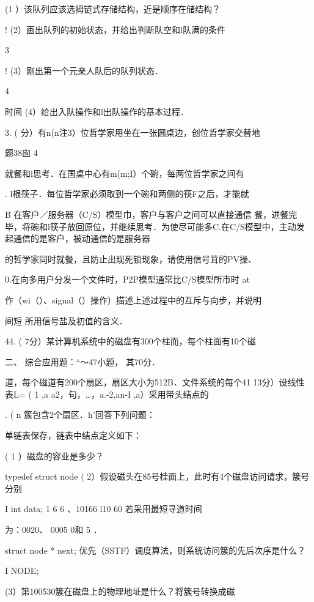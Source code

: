 {{    (1  ）该队列应该选拇链式存储结构，近是顺序在储结构？

    !    (2）画出队列的初始状态，并给出判断队空和l队满的条件

    3

    !    (3）刚出第一个元亲人队后的队列状态．

    4

    时间    (4）给出入队操作和l出队操作的基本过程．

    3. ( 分）有n(n注3）位哲学家用坐在一张圆桌边，创位哲学家交替地

    题38囱    4

    就餐和l思考．在国桌中心有m(m;I）个碗，每两位哲学家之间有

    .    l根筷子．每位哲学家必须取到一个碗和两侧的筷F之后，才能就

   B 在客户／服务器（C/S）模型巾，客户与客户之间可以直接通信    餐，进餐完毕，将碗和l筷子放回原位，并继续思考．为使尽可能多C.在C/S模型中，主动发起通信的是客户，被动通信的是服务器

    的哲学家同时就餐，且防止出现死锁现象，请使用信号茸的PV操、

   0.在向多用户分发一个文件时，P2P模型通常比C/S模型所市时    at

    作（wi（）、signal（）操作）描述上述过程中的互斥与向步，并说明

   间短    所用信号盐及初值的含义．

    44. ( 7分）某计算机系统中的磁盘有300个柱而，每个柱面有10个磁

    二、  综合应用题：“～47小题， 其70分．

    道，每个磁道有200个扇区，扇区大小为512B．文件系统的每个41  13分）设线性表L= ( 1 ,a  a2，句，…，a.-2,an-I ,a）采用带头结点的

  . (     n    簇包含2个扇区．h'回答下列问题：

   单链表保存，链表中结点定义如下：

    ( 1 ）磁盘的容业是多少？

   typedef struct node    ( 2）假设磁头在85号桂面上，此时有4个磁盘访问请求，簇号分别

    I   int data;    1   6  6    、10166   l10  60  若采用最短寻道时间

    为：0020、 0005    0和    5  ．

    struct node * next;    优先（SSTF）调度算法，则系统访问簇的先后次序是什么？

    I NODE;

    (3）第100530簇在磁盘上的物理地址是什么？将簇号转换成磁

}}

